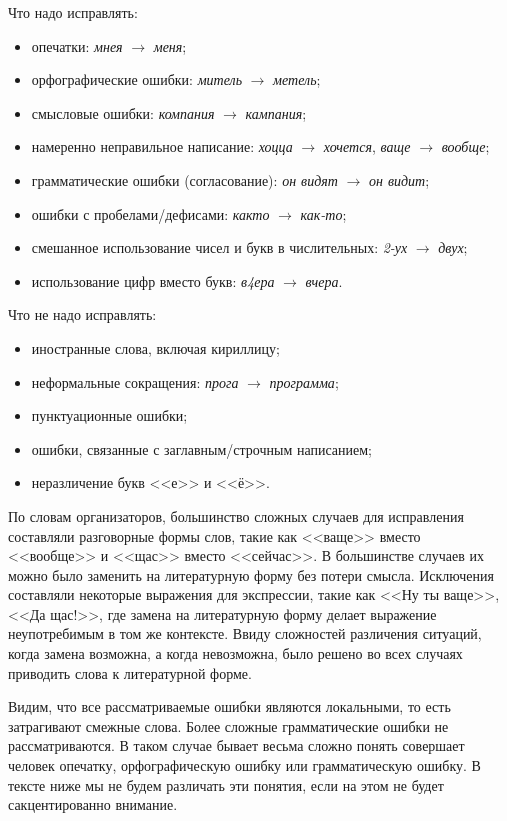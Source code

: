 Что надо исправлять:
\begin{itemize}
	\item опечатки: \textit{мнея} $\rightarrow$ \textit{меня};
	\item орфографические ошибки: \textit{митель} $\rightarrow$ \textit{метель};
	\item смысловые ошибки: \textit{компания} $\rightarrow$ \textit{кампания};
	\item намеренно неправильное написание: \textit{хоцца} $\rightarrow$ \textit{хочется}, \textit{ваще} $\rightarrow$ \textit{вообще};
	\item грамматические ошибки (согласование): \textit{он видят} $\rightarrow$ \textit{он видит};
	\item ошибки с пробелами/дефисами: \textit{както} $\rightarrow$ \textit{как-то};
	\item смешанное использование чисел и букв в числительных: \textit{2-ух} $\rightarrow$ \textit{двух};
	\item использование цифр вместо букв: \textit{в4ера} $\rightarrow$ \textit{вчера}.
\end{itemize}

Что не надо исправлять:
\begin{itemize}
	\item иностранные слова, включая кириллицу;
	\item неформальные сокращения: \textit{прога} $\rightarrow$ \textit{программа};
	\item пунктуационные ошибки;
	\item ошибки, связанные с заглавным/строчным написанием;
	\item неразличение букв <<е>> и <<ё>>.
\end{itemize}

По словам организаторов, большинство сложных случаев для исправления составляли разговорные формы слов, такие как <<ваще>> вместо <<вообще>> и <<щас>> вместо <<сейчас>>. В большинстве случаев их можно было заменить на литературную форму без потери смысла. Исключения составляли некоторые выражения для экспрессии, такие как <<Ну ты ваще>>, <<Да щас!>>, где замена на литературную форму делает выражение неупотребимым в том же контексте. Ввиду сложностей различения ситуаций, когда замена возможна, а когда невозможна, было решено во всех случаях приводить слова к литературной форме.

Видим, что все рассматриваемые ошибки являются локальными, то есть затрагивают смежные слова. Более сложные грамматические ошибки не рассматриваются. В таком случае бывает весьма сложно понять совершает человек опечатку, орфографическую ошибку или грамматическую ошибку. В тексте ниже мы не будем различать эти понятия, если на этом не будет сакцентированно внимание. 

